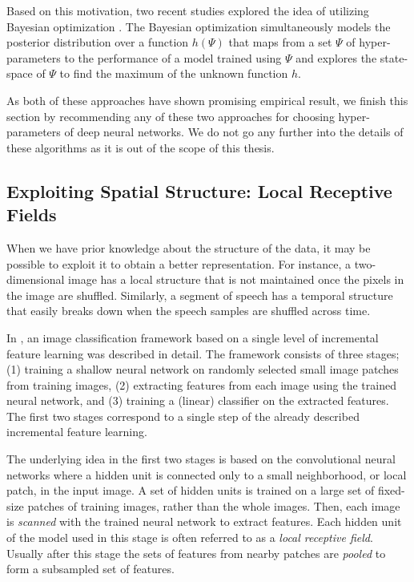 \documentclass[dissertation,nocontribution,draft*]{aaltoseries}
\begin{document}
Based on this motivation, two recent studies
\citep{Bergstra2011,Snoek2012} explored the idea of
utilizing Bayesian optimization \citep[see, e.g.,][and
references therein]{Brochu2010}. The Bayesian optimization
simultaneously models the posterior distribution over a
function $h(\Psi)$ that maps from a set $\Psi$ of
hyper-parameters to the performance of a model trained using
$\Psi$ and explores the state-space of $\Psi$ to find the
maximum of the unknown function $h$.

As both of these approaches have shown promising empirical
result, we finish this section by recommending any of these
two approaches for choosing hyper-parameters of deep neural
networks. We do not go any further into the details of these
algorithms as it is out of the scope of this thesis.

\subsection{Exploiting Spatial Structure: Local Receptive
Fields}
\label{sec:basic_blocks2}

When we have prior knowledge about the structure of the
data, it may be possible to exploit it to obtain a better
representation. For instance, a two-dimensional image has a
local structure that is not maintained once the pixels in
the image are shuffled.  Similarly, a segment of speech has
a temporal structure that easily breaks down when the speech
samples are shuffled across time.

In \citep{Coates2011}, an image classification framework
based on a single level of incremental feature learning was
described in detail. The framework consists of three stages;
(1) training a shallow neural network on randomly selected
small image patches from training images, (2) extracting
features from each image using the trained neural network,
and (3) training a (linear) classifier on the extracted
features.  The first two stages correspond to a single step
of the already described incremental feature learning.

The underlying idea in the first two stages is based on the
convolutional neural networks \citep[see,
e.g.,][]{Lecun1998,Lee2009} where a hidden unit is connected
only to a small neighborhood, or local patch, in the input
image. A set of hidden units is trained on a large set of
fixed-size patches of training images, rather than the whole
images.  Then, each image is \textit{scanned} with the
trained neural network to extract features. Each hidden unit
of the model used in this stage is often referred to as a
\textit{local receptive field}.  Usually after this stage
the sets of features from nearby patches are \textit{pooled}
to form a subsampled set of features.
\end{document}
